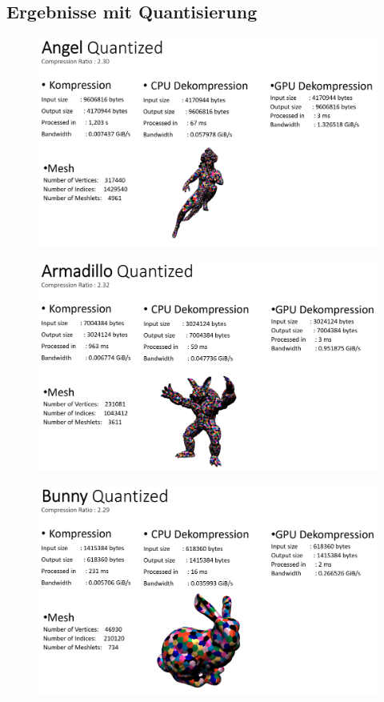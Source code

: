 \subsection{Ergebnisse mit Quantisierung}
\begin{figure}[h]
  \centering  
  \includegraphics[scale=0.28]{Bilder/ergebnisse_full/angel_quantized.png}
\end{figure}
\begin{figure}[h]
  \centering  
  \includegraphics[scale=0.28]{Bilder/ergebnisse_full/armadillo_quantized.png}
\end{figure}
\begin{figure}[h]
  \centering  
  \includegraphics[scale=0.28]{Bilder/ergebnisse_full/bunny_quantized.png}
\end{figure}
